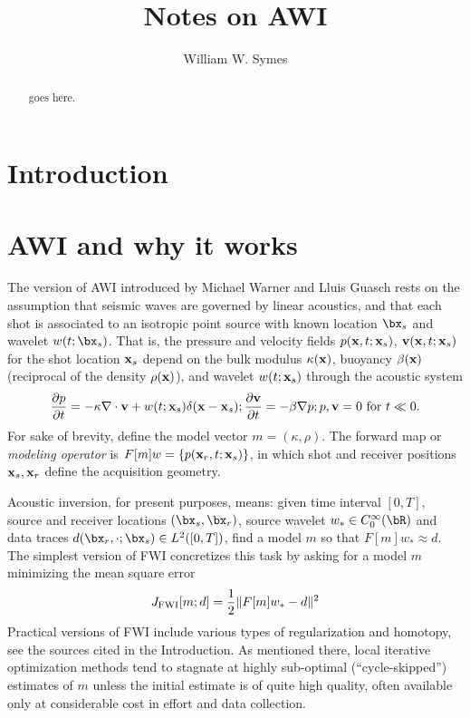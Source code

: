\title{Notes on AWI}
\author{William W. Symes}

\begin{abstract}
goes here.
\end{abstract}

\section{Introduction}

\section{AWI and why it works}

The version of AWI introduced by Michael Warner and Lluis Guasch \cite[]{Warner:16,GuaschWarnerRavaut:GEO19} rests on the assumption that seismic waves are governed by linear acoustics, and that each shot is associated to an isotropic point source with known location $\bx_s$ and wavelet $w(t;\bx_s)$. That is, the pressure and velocity fields $p({\bf x},t;{\bf x}_s)$, ${\bf v}({\bf x},t;{\bf x}_s)$ for the shot location ${\bf x}_s$ depend on the bulk modulus $\kappa({\bf x})$, buoyancy $\beta({\bf x})$ (reciprocal of the density $\rho({\bf x})$), and wavelet $w(t;{\bf x}_s)$ through the acoustic system
 $$
 \frac{\partial p}{\partial t} = - \kappa \nabla \cdot {\bf v} +
w(t;{\bf x}_s) \delta({\bf x}-{\bf x}_s);
\frac{\partial {\bf v}}{\partial t} = - \beta \nabla p; 
p, {\bf v} = 0 \mbox{ for }  t \ll 0.
$$
For sake of brevity, define the model vector $m=(\kappa,\rho)$. The forward map or {\em modeling operator} is $F[m]w = \{p({\bf x}_r,t;{\bf x}_s)\}$, in which shot and receiver positions ${\bf x}_s, {\bf x}_r$ define the acquisition geometry.

Acoustic inversion, for present purposes, means: given time interval $[0,T]$, source and receiver locations $(\bx_s,\bx_r)$, source wavelet $w_* \in C_0^{\infty}(\bR)$ and data traces $d(\bx_r,\cdot;\bx_s) \in L^2([0,T])$, find a model $m$ so that $F[m]w_* \approx d$. The simplest version of FWI concretizes this task by asking for a model $m$ minimizing the mean square error
\begin{equation}
  \label{eqn:fwi}
  J_{\rm FWI}[m;d] = \frac{1}{2}\|F[m]w_*-d\|^2
\end{equation}
Practical versions of FWI include various types of regularization and homotopy, see the sources cited in the Introduction. As mentioned there, local iterative optimization methods tend to stagnate at highly sub-optimal (``cycle-skipped'') estimates of $m$ unless the initial estimate is of quite high quality, often available only at considerable cost in effort and data collection.

